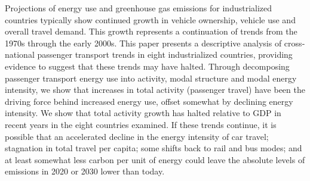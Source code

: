 Projections of energy use and greenhouse gas emissions for industrialized countries typically show continued growth in vehicle ownership, vehicle use and overall travel demand. This growth represents a continuation of trends from the 1970s through the early 2000s. This paper presents a descriptive analysis of cross‐national passenger transport trends in eight industrialized countries, providing evidence to suggest that these trends may have halted. Through decomposing passenger transport energy use into activity, modal structure and modal energy intensity, we show that increases in total activity (passenger travel) have been the driving force behind increased energy use, offset somewhat by declining energy intensity. We show that total activity growth has halted relative to GDP in recent years in the eight countries examined. If these trends continue, it is possible that an accelerated decline in the energy intensity of car travel; stagnation in total travel per capita; some shifts back to rail and bus modes; and at least somewhat less carbon per unit of energy could leave the absolute levels of emissions in 2020 or 2030 lower than today. 
